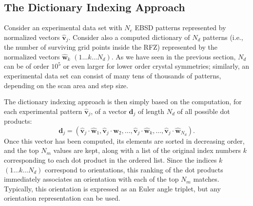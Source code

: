 \documentclass[DIV=calc, paper=letter, fontsize=11pt]{scrartcl}	 %
\begin{document}
\subsection{The Dictionary Indexing Approach}
Consider an experimental data set with $N_e$ EBSD patterns represented by normalized vectors $\hat{\mathbf{v}}_j$. Consider also
a computed dictionary of $N_d$ patterns (i.e., the number of surviving grid points inside the RFZ) represented by the 
normalized vectors $\hat{\mathbf{w}}_k$ $(1\ldots k\ldots N_d)$.  As we have seen in the previous section, $N_d$ can be of order $10^5$ or 
even larger for lower order crystal symmetries; similarly, an experimental data set can consist of many tens of thousands of patterns, depending
on the scan area and step size.

The dictionary indexing approach is then simply based on the computation, for each experimental pattern $\hat{\mathbf{v}}_j$, 
of a vector $\mathbf{d}_j$ of length $N_d$ of all possible dot products:
\[
	\mathbf{d}_{j} = \left( \hat{\mathbf{v}}_j\cdot\hat{\mathbf{w}}_1, \hat{\mathbf{v}}_j\cdot\hat{\mathbf{w}}_2, \ldots,
	\hat{\mathbf{v}}_j\cdot\hat{\mathbf{w}}_k, \ldots, \hat{\mathbf{v}}_j\cdot\hat{\mathbf{w}}_{N_d}\right).
\] 
Once this vector has been computed, its elements are sorted in decreasing order, and the top $N_m$ values are kept, along with a list of 
the original index numbers $k$ corresponding to each dot product in the ordered list.  Since the indices $k$ $(1\ldots k\ldots N_d)$ correspond to
orientations, this ranking of the dot products immediately associates an orientation with each of the top $N_m$ matches.  Typically, this 
orientation is expressed as an Euler angle triplet, but any orientation representation can be used.
\end{document}
